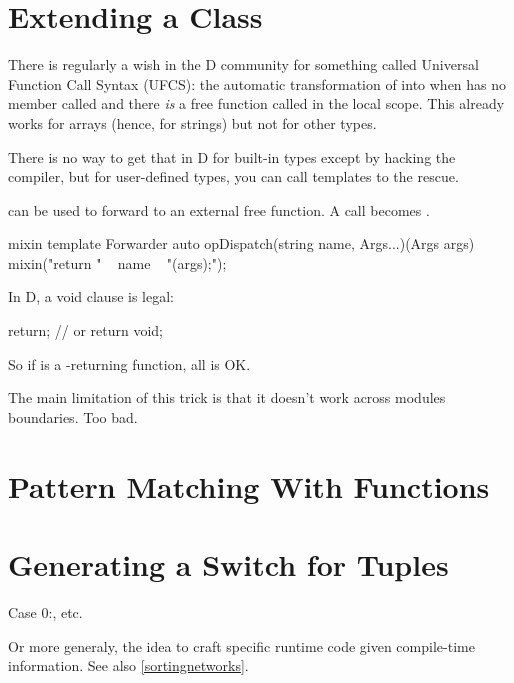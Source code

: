 
\section{Extending a Class}\label{extendingaclass}

There is regularly a wish in the D community for something called Universal Function Call Syntax (UFCS): the automatic transformation of  into  when  has no member called  and there \emph{is} a free function called  in the local scope. This already works for arrays (hence, for strings) but not for other types.

There is no way to get that in D for built-in types except by hacking the compiler, but for user-defined types, you can call templates to the rescue.

 can be used to forward to an external free function. A call  becomes .

\begin{dcode}
mixin template Forwarder
{
    auto opDispatch(string name, Args...)(Args args)
    {
        mixin("return " ~ name ~ "(args);");
    }
}
\end{dcode}

In D, a void  clause is legal: 

\begin{dcode}
return;
// or return void;
\end{dcode}

So if  is a -returning function, all is OK.

The main limitation of this trick is that it doesn't work across modules boundaries. Too bad.

\section{Pattern Matching With Functions}


\section{Generating a Switch for Tuples}
Case 0:, etc.

Or more generaly, the idea to craft specific runtime code given compile-time information.
See also \autoref{sortingnetworks}.
